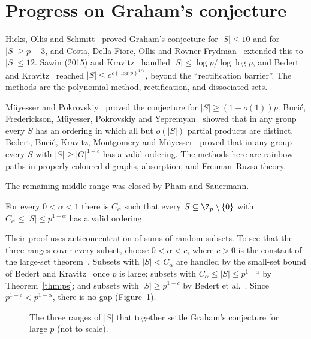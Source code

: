 \section{Progress on Graham's conjecture}\label{sec:progress}


Hicks, Ollis and Schmitt~\cite{hos19} proved Graham's conjecture for $|S|\leq10$ and for $|S|\geq p-3$, and Costa, Della Fiore, Ollis and Rovner-Frydman~\cite{cdor22} extended this to $|S|\leq12$. Sawin (2015) and Kravitz~\cite{kra24} handled $|S|\leq\log p/\log\log p$, and Bedert and Kravitz~\cite{bk24} reached $|S|\leq e^{c(\log p)^{1/4}}$, beyond the ``rectification barrier''. The methods are the polynomial method, rectification, and dissociated sets.


M\"uyesser and Pokrovskiy~\cite{mp22} proved the conjecture for $|S|\geq(1-o(1))p$. Buci\'c, Frederickson, M\"uyesser, Pokrovskiy and Yepremyan~\cite{bfmpy25} showed that in any group every $S$ has an ordering in which all but $o(|S|)$ partial products are distinct. Bedert, Buci\'c, Kravitz, Montgomery and M\"uyesser~\cite{bbkmm25} proved that in any group every $S$ with $|S|\geq|G|^{1-c}$ has a valid ordering. The methods here are rainbow paths in properly coloured digraphs, absorption, and Freiman--Ruzsa theory.


The remaining middle range was closed by Pham and Sauermann.

\begin{theorem}\label{thm:ps}
For every $0<\alpha<1$ there is $C_\alpha$ such that every $S\subseteq\Z_p\setminus\{0\}$ with $C_\alpha\leq|S|\leq p^{1-\alpha}$ has a valid ordering.
\end{theorem}

Their proof uses anticoncentration of sums of random subsets. To see that the three ranges cover every subset, choose $0<\alpha<c$, where $c>0$ is the constant of the large-set theorem~\cite{bbkmm25}. Subsets with $|S|<C_\alpha$ are handled by the small-set bound of Bedert and Kravitz~\cite{bk24} once $p$ is large; subsets with $C_\alpha\leq|S|\leq p^{1-\alpha}$ by Theorem~\ref{thm:ps}; and subsets with $|S|\geq p^{1-c}$ by Bedert et al.~\cite{bbkmm25}. Since $p^{1-c}<p^{1-\alpha}$, there is no gap (Figure~\ref{fig:graham-ranges}).

\begin{figure}[ht]
\centering

\caption{The three ranges of $|S|$ that together settle Graham's conjecture for large $p$ (not to scale).}
\label{fig:graham-ranges}
\end{figure}

